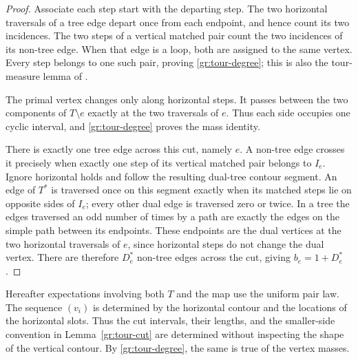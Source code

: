 \begin{proof}
Associate each step start with the departing step.  The two
horizontal traversals of a tree edge depart once from each endpoint,
and hence count its two incidences.  The two steps of a vertical
matched pair count the two incidences of its non-tree edge.  When
that edge is a loop, both are assigned to the same vertex.
Every step belongs to one such pair, proving
\eqref{gr:tour-degree}; this is also the tour-measure lemma of
\cite[Section~``From tree excursions to the measured quantum
sphere'']{MetricMaps}.

The primal vertex changes only along horizontal steps.  It passes
between the two components of $T\setminus e$ exactly at the two
traversals of $e$.  Thus each side occupies one cyclic interval, and
\eqref{gr:tour-degree} proves the mass identity.

There is exactly one tree edge across this cut, namely $e$.
A non-tree edge crosses it precisely when exactly one step of its
vertical matched pair belongs to $I_e$.  Ignore horizontal holds
and follow the resulting dual-tree contour segment.  An edge of
$T^*$ is traversed once on this segment exactly when its matched
steps lie on opposite sides of $I_e$; every other dual edge is
traversed zero or twice.  In a tree the edges traversed an odd number
of times by a path are exactly the edges on the simple path between
its endpoints.  These endpoints are the dual vertices at the two
horizontal traversals of $e$, since horizontal steps do not change
the dual vertex.  There are therefore $D_e^*$ non-tree edges across
the cut, giving $b_e=1+D_e^*$.
\end{proof}

Hereafter expectations involving both $T$ and the map use the uniform
pair law.  The sequence $(v_i)$ is determined by the horizontal
contour and the locations of the horizontal slots.  Thus the cut
intervals, their lengths, and the smaller-side convention in
Lemma~\ref{gr:tour-cut} are determined without inspecting the shape
of the vertical contour.  By \eqref{gr:tour-degree}, the same is true
of the vertex masses.

